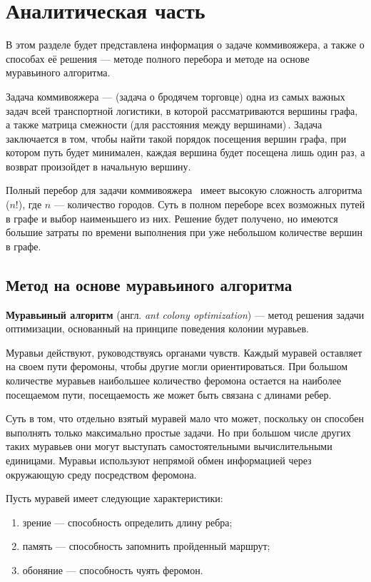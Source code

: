 \chapter{Аналитическая часть}
В этом разделе будет представлена информация о задаче коммивояжера,
а также о способах её решения — методе полного перебора и методе на основе муравьиного алгоритма.

Задача коммивояжера  --- (задача о бродячем торговце) одна из самых важных задач всей транспортной логистики, в которой рассматриваются вершины графа, а также матрица смежности (для расстояния между вершинами)\,\cite{task}. 
Задача заключается в том, чтобы найти такой порядок посещения вершин графа, при котором путь будет минимален, каждая вершина будет посещена лишь один раз, а возврат произойдет в начальную вершину. 

Полный перебор для задачи коммивояжера~\cite{full-comb} имеет высокую сложность алгоритма ($n!$), где $n$ --- количество городов. 
Суть в полном переборе всех возможных путей в графе и выбор наименьшего из них. 
Решение будет получено, но имеются большие затраты по времени выполнения при уже небольшом количестве вершин в графе.

\section{Метод на основе муравьиного алгоритма}

\textbf{Муравьиный алгоритм} (англ. \textit{ant colony optimization})  \cite{full-comb} --- метод решения задачи оптимизации, основанный на принципе поведения колонии муравьев.

Муравьи действуют, руководствуясь органами чувств. 
Каждый муравей оставляет на своем пути феромоны, чтобы другие могли ориентироваться. 
При большом количестве муравьев наибольшее количество феромона остается на наиболее посещаемом пути, посещаемость же может быть связана с длинами ребер.

Суть в том, что отдельно взятый муравей мало что может, поскольку он способен выполнять только максимально простые задачи. Но при большом числе других таких муравьев они могут выступать самостоятельными вычислительными единицами. Муравьи используют непрямой обмен информацией через окружающую среду посредством феромона.

Пусть муравей имеет следующие характеристики:
\begin{enumerate}[label=\arabic*)]
	\item зрение --- способность определить длину ребра;
	\item память --- способность запомнить пройденный маршрут;
	\item обоняние --- способность чуять феромон.
\end{enumerate}


